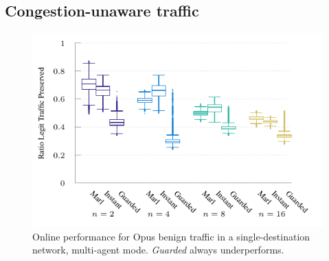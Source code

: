 \documentclass[10pt, times, conference, letterpaper]{IEEEtran}
\begin{document}
\subsection{Congestion-unaware traffic}
%	
%	
\begin{figure}
	\centering
	\includegraphics[width=0.75\linewidth]{../plots/tnsm-udp-box-separate}
	\vspace{-1em}
	\caption{
		Online performance for Opus benign traffic in a single-destination network, multi-agent mode.
		\emph{Guarded} always underperforms.
		\vspace{-1em}
		\label{fig:udp-tree-box}
	}
\end{figure}
\end{document}
